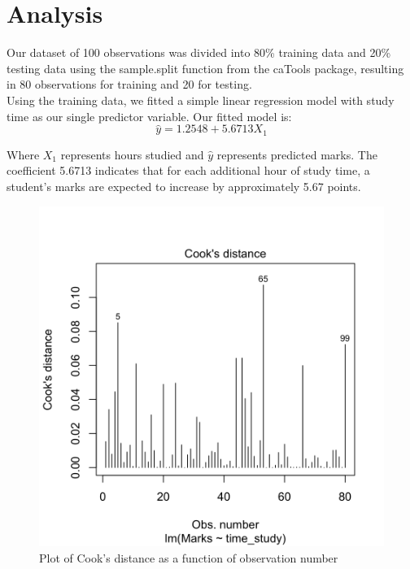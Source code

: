 \documentclass{article}
\begin{document}
\clearpage

\clearpage
\section{Analysis}

Our dataset of 100 observations was divided into 80\% training data and 20\% testing data using the sample.split function from the caTools package, resulting in 80 observations for training and 20 for testing.\\

\noindent Using the training data, we fitted a simple linear regression model with study time as our single predictor variable. Our fitted model is:
\begin{equation} \hat{y} = 1.2548 + 5.6713X_1 \end{equation}

\noindent Where $X_1$ represents hours studied and $\hat{y}$ represents predicted marks. The coefficient 5.6713 indicates that for each additional hour of study time, a student's marks are expected to increase by approximately 5.67 points.

\begin{figure}[h]
\centering
    \includegraphics[scale=0.3]{imgs/Cook_Distance.png}    
    \caption{Plot of Cook's distance as a function of observation number}
    \label{fig:cook}
\end{figure}
\end{document}
